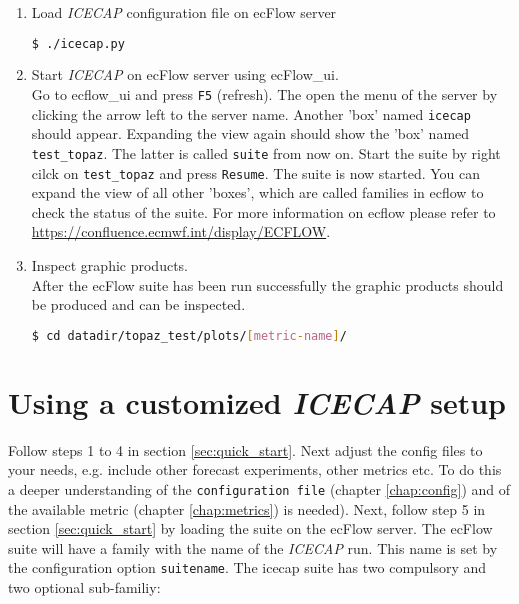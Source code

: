 \documentclass[DIV=10, parskip=full]{scrreprt}
\newcommand{\ice}{\textit{ICECAP}\xspace}
\begin{document}
\begin{enumerate}
	\item Load \ice configuration file on ecFlow server\\
	\begin{lstlisting}[language=bash]
		$ ./icecap.py
	\end{lstlisting}
	\item Start \ice on ecFlow server using ecFlow\_ui. \\
	Go to ecflow\_ui and press \texttt{F5} (refresh). The open the menu of the server by clicking the arrow left to the server name. Another 'box' named \texttt{icecap} should appear. Expanding the view again should show the 'box' named \texttt{test\_topaz}. The latter is called \texttt{suite} from now on. Start the suite by  right cilck on \texttt{test\_topaz} and press \texttt{Resume}. The suite is now started. You can expand the view of all other 'boxes', which are called families in ecflow to check the status of the suite. For more information on ecflow please refer to  \url{https://confluence.ecmwf.int/display/ECFLOW}.
	
	\item Inspect graphic products.  \\
	After the ecFlow suite has been run successfully the graphic products should be produced and can be inspected.
	\begin{lstlisting}[language=bash]
		$ cd datadir/topaz_test/plots/[metric-name]/
	\end{lstlisting}
	
\end{enumerate}



\section{Using a customized \ice setup} 
Follow steps 1 to 4 in section \ref{sec:quick_start}. Next adjust the config files to your needs, e.g. include other forecast experiments, other metrics etc. To do this a deeper understanding of the \texttt{configuration file} (chapter \ref{chap:config}) and of the available metric (chapter \ref{chap:metrics}) is needed). Next, follow step 5 in section \ref{sec:quick_start} by loading the suite on the ecFlow server. The ecFlow suite will have a family with the name of the \ice run. This name is set by the configuration option \texttt{suitename}. The icecap suite has two compulsory and two optional sub-familiy:
\end{document}

